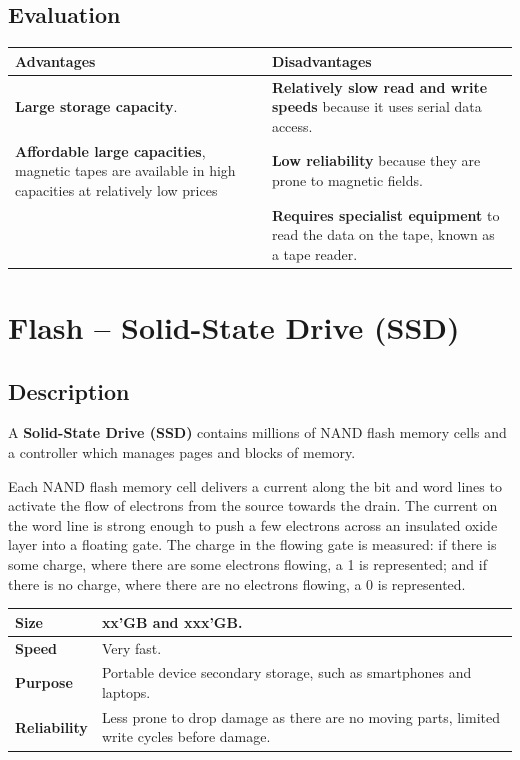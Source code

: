 \documentclass[a4paper]{systems-software}
\begin{document}
\subsection*{Evaluation}

\begin{longtabu} to \textwidth {| X[1,l] | X[1,l] |}
    \hline
    \textbf{Advantages} & \textbf{Disadvantages}
	\\ \hline
	\textbf{Large storage capacity}. & \textbf{Relatively slow read and write speeds} because it uses serial data access.
	\\ \hline
	\textbf{Affordable large capacities}, magnetic tapes are available in high capacities at relatively low prices & \textbf{Low reliability} because they are prone to magnetic fields.
	\\ \hline
	& \textbf{Requires specialist equipment} to read the data on the tape, known as a tape reader.
	\\ \hline
\end{longtabu}


\section*{Flash -- Solid-State Drive (SSD)}

\subsection*{Description}

A \textbf{Solid-State Drive (SSD)} contains millions of NAND flash memory cells and a controller which manages pages and blocks of memory.

Each NAND flash memory cell delivers a current along the bit and word lines to activate the flow of electrons from the source towards the drain. The current on the word line is strong enough to push a few electrons across an insulated oxide layer into a floating gate. The charge in the flowing gate is measured: if there is some charge, where there are some electrons flowing, a 1 is represented; and if there is no charge, where there are no electrons flowing, a 0 is represented.

\begin{longtabu} to \textwidth {| X[1,l] | X[6,l] |}
    \hline
    \textbf{Size} & xx’GB and xxx’GB.
	\\ \hline
	\textbf{Speed} & Very fast.
	\\ \hline
	\textbf{Purpose} & Portable device secondary storage, such as smartphones and laptops.
	\\ \hline
	\textbf{Reliability} & Less prone to drop damage as there are no moving parts, limited write cycles before damage.
	\\ \hline
\end{longtabu}
\end{document}
